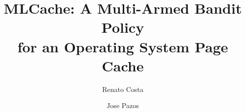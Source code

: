 \documentclass[sigconf]{acmart}
\begin{document}
\title{MLCache: A Multi-Armed Bandit Policy \\ for an Operating System Page Cache}

\author{Renato Costa}

\author{Jose Pazos}


\maketitle









\end{document}
